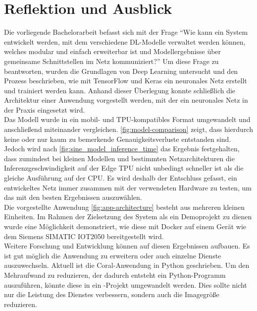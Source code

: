 \chapter{Reflektion und Ausblick}
Die vorliegende Bachelorarbeit befasst sich mit der Frage
\enquote{Wie kann ein System entwickelt werden, mit dem verschiedene DL-Modelle
verwaltet werden können, welches modular und einfach erweiterbar ist
und Modellergebnisse über gemeinsame Schnittstellen im Netz kommuniziert?}
Um diese Frage zu beantworten, wurden
die Grundlagen von Deep Learning untersucht
und den Prozess beschrieben, wie mit TensorFlow und Keras
ein neuronales Netz erstellt und trainiert werden kann.
Anhand dieser Überlegung konnte schließlich die Architektur einer Anwendung
vorgestellt werden, mit der ein neuronales Netz in der Praxis eingesetzt wird.\\[8pt]
Das Modell wurde in ein mobil- und TPU-kompatibles Format umgewandelt
und anschließend miteinander vergleichen.
\autoref{fig:model-comparison} zeigt,
dass hierdurch keine oder nur kaum zu bemerkende Genauigkeitsverluste
entstanden sind.
Jedoch wird nach \autoref{fig:sine_model_inference_time}
das Ergebnis festgehalten,
dass zumindest bei kleinen Modellen und bestimmten Netzarchitekturen
die Inferenzgeschwindigkeit
auf der Edge TPU nicht unbedingt schneller ist als die gleiche Ausführung auf der CPU.
Es wird deshalb der Entschluss gefasst,
ein entwickeltes Netz immer zusammen mit der verwendeten Hardware zu testen,
um das mit den besten Ergebnissen auszuwählen.\\[8pt]
Die vorgestellte Anwendung \eqref{fig:app-architecture} besteht aus mehreren kleinen
Einheiten. Im Rahmen der Zielsetzung des System als ein Demoprojekt zu dienen
wurde eine Möglichkeit demonstriert,
wie diese mit Docker auf einem Gerät wie dem Siemens
SIMATIC IOT2050 bereitgestellt wird.\\[8pt]
Weitere Forschung und Entwicklung können auf diesen Ergebnissen
aufbauen. Es ist gut möglich die Anwendung zu erweitern oder
auch einzelne Dienste auszuwechseln.
Aktuell ist die Coral-Anwendung in Python geschrieben.
Um den Mehraufwand zu reduzieren, der dadurch entsteht ein
Python-Programm auszuführen, könnte diese in ein \cpp{}-Projekt
umgewandelt werden.
Dies sollte nicht nur die Leistung des Dienstes verbessern, sondern
auch die Imagegröße reduzieren.